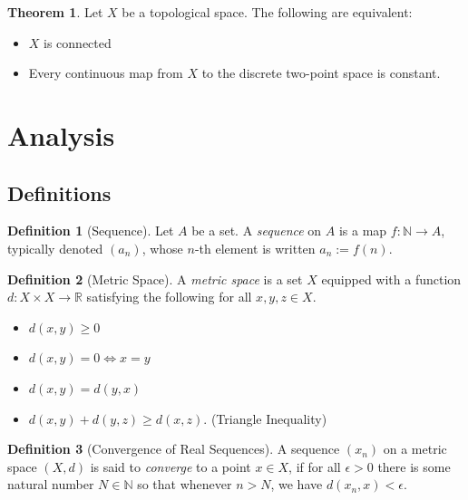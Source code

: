 \documentclass{article}
\theoremstyle{definition}
\newtheorem{definition}{Definition}[subsection]
\newtheorem{theorem}{Theorem}[subsection]
\begin{document}
\begin{theorem}
    Let $X$ be a topological space. The following are equivalent:
    \begin{itemize}
        \item $X$ is connected
        \item Every continuous map from $X$ to the discrete two-point space is constant.
    \end{itemize}
\end{theorem}

\section{Analysis}
    \setcounter{subsection}{-1}
    \subsection{Definitions}
    \begin{definition}[Sequence]
        Let $A$ be a set. A \textit{sequence} on $A$ is a map $f:\mathbb{N}\rightarrow A$, typically denoted $(a_n)$, whose $n$-th element is written $a_n:=f(n)$.
    \end{definition}
    \begin{definition}[Metric Space]
        A \textit{metric space} is a set $X$ equipped with a function $d:X\times X\rightarrow \mathbb{R}$ satisfying the following for all $x,y,z\in X$.
        \begin{itemize}
            \item $d(x,y)\geq 0$
            \item $d(x,y)=0\iff x=y$
            \item $d(x,y)=d(y,x)$
            \item $d(x,y)+d(y,z)\geq d(x,z)$. (Triangle Inequality)
        \end{itemize}
    \end{definition}
    \begin{definition}[Convergence of Real Sequences]
        A sequence $(x_n)$ on a metric space $(X,d)$ is said to \textit{converge} to a point $x\in X$, if for all $\epsilon >0$ there is some natural number $N\in\mathbb{N}$ so that whenever $n> N$, we have $d(x_n,x) < \epsilon$.
    \end{definition}
\end{document}
